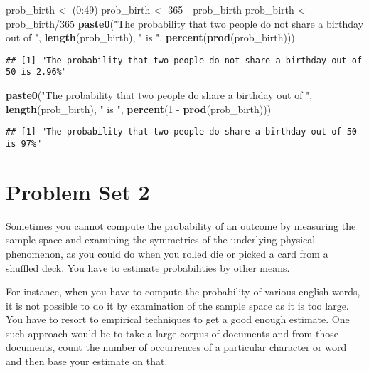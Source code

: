 \documentclass[]{article}
\newenvironment{Shaded}{\begin{snugshade}}{\end{snugshade}}
\newcommand{\KeywordTok}[1]{\textcolor[rgb]{0.13,0.29,0.53}{\textbf{{#1}}}}
\newcommand{\DecValTok}[1]{\textcolor[rgb]{0.00,0.00,0.81}{{#1}}}
\newcommand{\StringTok}[1]{\textcolor[rgb]{0.31,0.60,0.02}{{#1}}}
\newcommand{\NormalTok}[1]{{#1}}
\begin{document}
\begin{Shaded}
\begin{Highlighting}[]
\NormalTok{prob_birth <-}\StringTok{ }\NormalTok{(}\DecValTok{0}\NormalTok{:}\DecValTok{49}\NormalTok{)}
\NormalTok{prob_birth <-}\StringTok{ }\DecValTok{365} \NormalTok{-}\StringTok{ }\NormalTok{prob_birth}
\NormalTok{prob_birth <-}\StringTok{ }\NormalTok{prob_birth/}\DecValTok{365}
\KeywordTok{paste0}\NormalTok{(}\StringTok{"The probability that two people do not share a birthday out of "}\NormalTok{, }
       \KeywordTok{length}\NormalTok{(prob_birth), }\StringTok{" is "}\NormalTok{, }\KeywordTok{percent}\NormalTok{(}\KeywordTok{prod}\NormalTok{(prob_birth)))}
\end{Highlighting}
\end{Shaded}

\begin{verbatim}
## [1] "The probability that two people do not share a birthday out of 50 is 2.96%"
\end{verbatim}

\begin{Shaded}
\begin{Highlighting}[]
\KeywordTok{paste0}\NormalTok{(}\StringTok{"The probability that two people do share a birthday out of "}\NormalTok{, }
       \KeywordTok{length}\NormalTok{(prob_birth), }\StringTok{" is "}\NormalTok{, }\KeywordTok{percent}\NormalTok{(}\DecValTok{1} \NormalTok{-}\StringTok{ }\KeywordTok{prod}\NormalTok{(prob_birth)))}
\end{Highlighting}
\end{Shaded}

\begin{verbatim}
## [1] "The probability that two people do share a birthday out of 50 is 97%"
\end{verbatim}

\section{Problem Set 2}\label{problem-set-2}

Sometimes you cannot compute the probability of an outcome by measuring
the sample space and examining the symmetries of the underlying physical
phenomenon, as you could do when you rolled die or picked a card from a
shuffled deck. You have to estimate probabilities by other means.

For instance, when you have to compute the probability of various
english words, it is not possible to do it by examination of the sample
space as it is too large. You have to resort to empirical techniques to
get a good enough estimate. One such approach would be to take a large
corpus of documents and from those documents, count the number of
occurrences of a particular character or word and then base your
estimate on that.
\end{document}
